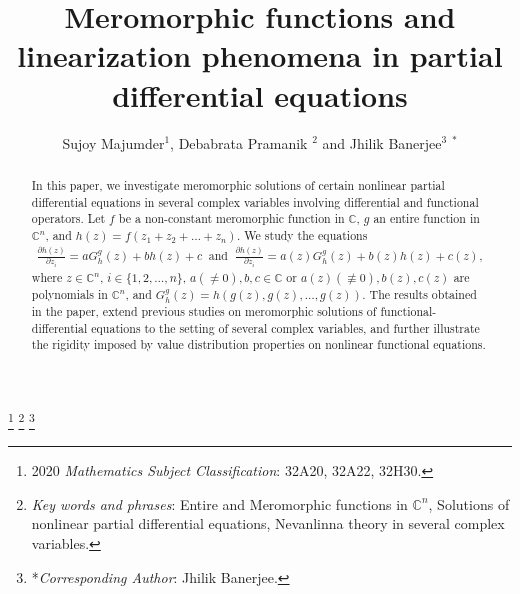 \documentclass[11pt,reqno]{amsart}
\numberwithin{equation}{section}
\begin{document}
\title[M\MakeLowercase{eromorphic Functions and Linearization Phenomena in Partial Differential}......]{\LARGE 
M\Large \MakeLowercase{eromorphic Functions and Linearization Phenomena in Partial Differential Equations}}

\date{}
\author[S. M\MakeLowercase{ajumder}, D. P\MakeLowercase{ramanik and} J. B\MakeLowercase{anerjee}]{S\MakeLowercase{ujoy} M\MakeLowercase{ajumder}$^1$, D\MakeLowercase{ebabrata} P\MakeLowercase{ramanik }$^2$ \MakeLowercase{and}  J\MakeLowercase{hilik} B\MakeLowercase{anerjee}$^3$ $^{*}$}
\address{$^{1}$ Department of Mathematics, Raiganj University, Raiganj, West Bengal-733134, India.}
\address{$^{2}$ Department of Mathematics, Raiganj University, Raiganj, West Bengal-733134, India.}
\address{$^{3}$ Department of Mathematics, University of Kalyani, West Bengal 741235, India.}


\renewcommand{\thefootnote}{}
\footnote{2020 \emph{Mathematics Subject Classification}: 32A20, 32A22, 32H30.}
\footnote{\emph{Key words and phrases}: Entire and Meromorphic functions in $\mathbb{C}^n$, Solutions of nonlinear partial differential equations, Nevanlinna theory in several complex variables.}
\footnote{*\emph{Corresponding Author}: Jhilik Banerjee.}

\renewcommand{\thefootnote}{\arabic{footnote}}
\setcounter{footnote}{0}

\begin{abstract} 
In this paper, we investigate meromorphic solutions of certain nonlinear partial differential equations in several complex variables involving differential and functional operators. Let $f$ be a non-constant meromorphic function in $\mathbb{C}$, $g$ an entire function in $\mathbb{C}^n$, and $h(z)=f(z_1+z_2+\ldots+z_n)$. We study the equations
\begin{align*}
\frac{\partial h(z)}{\partial z_i}=a G^g_{h}(z)+bh(z)+c\;\;\text{and}\;\;\frac{\partial h(z)}{\partial z_i}=a(z)G^g_{h}(z)+b(z)h(z)+c(z),
\end{align*}
where $z\in\mathbb{C}^n$, $i\in\{1,2,\ldots,n\}$, $a(\neq 0), b, c\in\mathbb{C}$ or $a(z)(\not\equiv 0), b(z),c(z)$ are polynomials in $\mathbb{C}^n$, and $G^g_h(z)=h(g(z),g(z),\ldots,g(z))$.
The results obtained in the paper, extend previous studies on meromorphic solutions of functional-differential equations to the setting of several complex variables, and further illustrate the rigidity imposed by value distribution properties on nonlinear functional equations.
\end{abstract}
\end{document}
